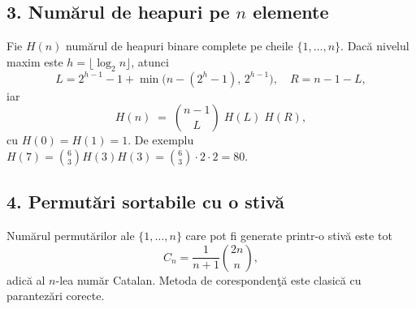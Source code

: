 \documentclass[11pt,a4paper]{article}
\theoremstyle{definition}
\theoremstyle{plain}
\theoremstyle{remark}
\begin{document}
\subsection*{3. Numărul de heapuri pe \(n\) elemente}
Fie \(H(n)\) numărul de heapuri binare complete pe cheile \(\{1,\dots,n\}\). Dacă nivelul maxim este \(h=\lfloor\log_2n\rfloor\), atunci
\[
  L = 2^{h-1}-1 + \min\bigl(n-(2^h-1),\,2^{h-1}\bigr),\quad
  R = n-1-L,
\]
iar
\[
  H(n) \;=\;\binom{n-1}{L}\;H(L)\;H(R),
\]
cu \(H(0)=H(1)=1\). De exemplu \(H(7)=\binom{6}{3}H(3)H(3)=\binom{6}{3}\cdot2\cdot2=80\).

\subsection*{4. Permutări sortabile cu o stivă}
Numărul permutărilor ale \(\{1,\dots,n\}\) care pot fi generate printr-o stivă este tot
\[
  C_n = \frac1{n+1}\binom{2n}{n},
\]
adică al \(n\)-lea număr Catalan. Metoda de corespondenţă este clasică cu parantezări corecte.
\end{document}
